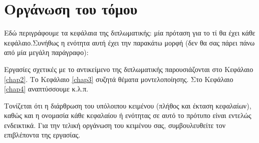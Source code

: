 \section{Οργάνωση του τόμου}

Εδώ περιγράφουμε τα κεφάλαια της διπλωματικής: μία πρόταση για το τί θα έχει  κάθε κεφάλαιο.Συνήθως η ενότητα αυτή έχει την παρακάτω μορφή (δεν θα σας πάρει πάνω από μία μεγάλη παράγραφο):

Εργασίες σχετικές με το αντικείμενο της διπλωματικής παρουσιάζονται στο Κεφάλαιο \ref{chap2}. Το Κεφάλαιο \ref{chap3} συζητά θέματα μοντελοποίησης. Στο Κεφάλαιο \ref{chap4} αναπτύσσουμε κ.λ.π. 

Τονίζεται ότι η διάρθρωση του υπόλοιπου κειμένου (πλήθος και έκταση κεφαλαίων), καθώς και η ονομασία κάθε κεφαλαίου ή ενότητας σε αυτό το πρότυπο είναι εντελώς ενδεικτικά. Για την τελική οργάνωση του κειμένου σας, συμβουλευθείτε τον επιβλέποντα της εργασίας.

